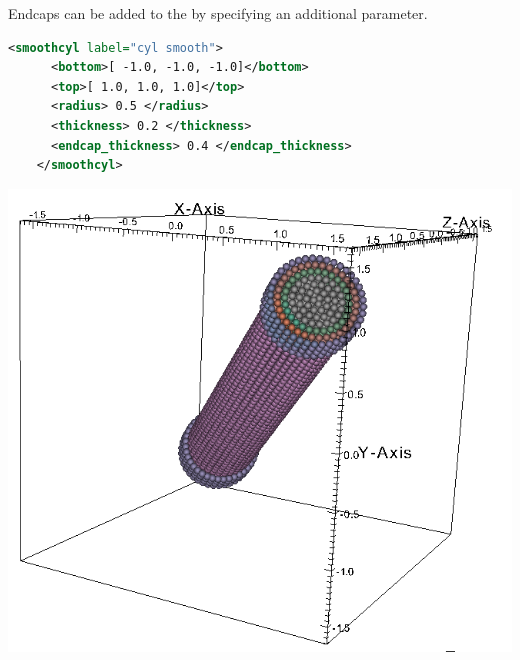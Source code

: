 \begin{minipage}{0.6\textwidth}
  Endcaps can be added to the  by specifying an additional
   parameter.  
  \begin{lstlisting}[language=XML]
    <smoothcyl label="cyl smooth">
      <bottom>[ -1.0, -1.0, -1.0]</bottom>
      <top>[ 1.0, 1.0, 1.0]</top>
      <radius> 0.5 </radius>
      <thickness> 0.2 </thickness>
      <endcap_thickness> 0.4 </endcap_thickness>
    </smoothcyl>
  \end{lstlisting}
\end{minipage}
\begin{minipage}{0.4\textwidth}
  \centering
  \includegraphics[width=0.9\columnwidth]{FIGS/geometry/geom_smooth_cyl_hollow_endcap.png}
\end{minipage}


